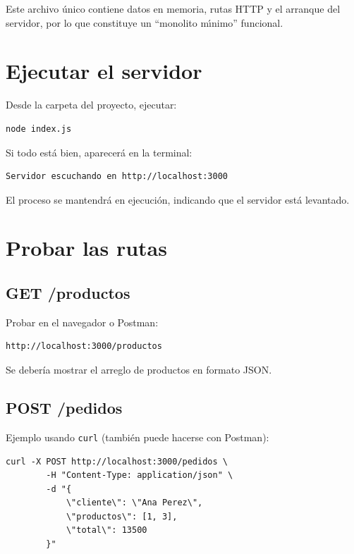\documentclass[11pt,a4paper]{article}
\begin{document}
	
	Este archivo \'unico contiene datos en memoria, rutas HTTP y el arranque del servidor, por lo que constituye un ``monolito m\'{\i}nimo'' funcional.
	
	\section{Ejecutar el servidor}
	
	Desde la carpeta del proyecto, ejecutar:
	
	\begin{lstlisting}[style=terminalstyle]
		node index.js
	\end{lstlisting}
	
	Si todo est\'a bien, aparecer\'a en la terminal:
	
	\begin{lstlisting}[style=terminalstyle]
		Servidor escuchando en http://localhost:3000
	\end{lstlisting}
	
	El proceso se mantendr\'a en ejecuci\'on, indicando que el servidor est\'a levantado. 
	
	\section{Probar las rutas}
	
	\subsection{GET /productos}
	
	Probar en el navegador o Postman:
	
	\begin{lstlisting}[style=terminalstyle]
		http://localhost:3000/productos
	\end{lstlisting}
	
	Se deber\'ia mostrar el arreglo de productos en formato JSON. 
	
	\subsection{POST /pedidos}
	
	Ejemplo usando \texttt{curl} (tambi\'en puede hacerse con Postman):
	
	\begin{lstlisting}[style=terminalstyle, caption={Usando linux, Mac}]
		curl -X POST http://localhost:3000/pedidos \
		-H "Content-Type: application/json" \
		-d "{
			\"cliente\": \"Ana Perez\",
			\"productos\": [1, 3],
			\"total\": 13500
		}"
	\end{lstlisting}
	
\end{document}
